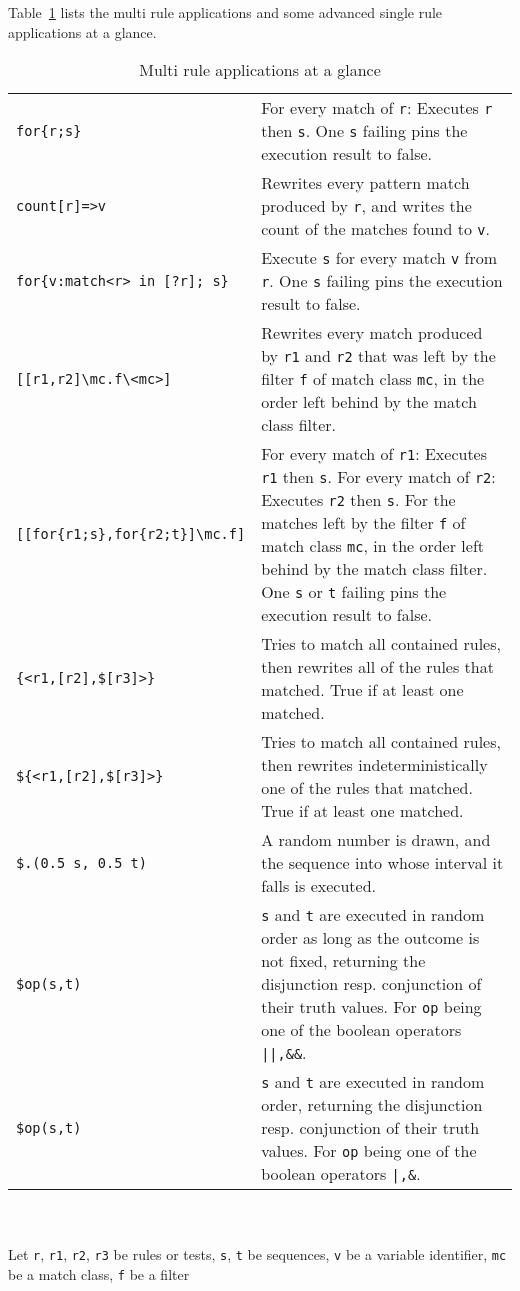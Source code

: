 Table~\ref{seqmultitab} lists the multi rule applications and some advanced single rule applications at a glance.

\begin{table}[htbp]
\begin{minipage}{\linewidth} \renewcommand{\footnoterule}{} 
\begin{tabularx}{\linewidth}{|lX|}
\hline
\texttt{for\{r;s\}} & For every match of \texttt{r}: Executes \texttt{r} then \texttt{s}. One \texttt{s} failing pins the execution result to false.\\
\texttt{count[r]=>v} & Rewrites every pattern match produced by \texttt{r}, and writes the count of the matches found to \texttt{v}.\\
\texttt{for\{v:match<r> in [?r]; s\}} & Execute \texttt{s} for every match \texttt{v} from \texttt{r}. One \texttt{s} failing pins the execution result to false.\\
\hline
\texttt{[[r1,r2]\textbackslash mc.f\textbackslash<mc>]} & Rewrites every match produced by \texttt{r1} and \texttt{r2} that was left by the filter \texttt{f} of match class \texttt{mc}, in the order left behind by the match class filter.\\
\texttt{[[for\{r1;s\},for\{r2;t\}]\textbackslash mc.f]} & For every match of \texttt{r1}: Executes \texttt{r1} then \texttt{s}. For every match of \texttt{r2}: Executes \texttt{r2} then \texttt{s}. For the matches left by the filter \texttt{f} of match class \texttt{mc}, in the order left behind by the match class filter. One \texttt{s} or \texttt{t} failing pins the execution result to false.\\
\hline
\texttt{\{<r1,[r2],\$[r3]>\}} & Tries to match all contained rules, then rewrites all of the rules that matched. True if at least one matched.\\
\texttt{\$\{<r1,[r2],\$[r3]>\}} & Tries to match all contained rules, then rewrites indeterministically one of the rules that matched. True if at least one matched.\\
\texttt{\$.(0.5 s, 0.5 t)} & A random number is drawn, and the sequence into whose interval it falls is executed.\\
\texttt{\$op(s,t)} & \texttt{s} and \texttt{t} are executed in random order as long as the outcome is not fixed, returning the disjunction resp. conjunction of their truth values. For \texttt{op} being one of the boolean operators \texttt{||,\&\&}.\\
\texttt{\$op(s,t)} & \texttt{s} and \texttt{t} are executed in random order, returning the disjunction resp. conjunction of their truth values. For \texttt{op} being one of the boolean operators \texttt{|,\&}.\\
\hline
\end{tabularx}\indexmain{\texttt{<>}}\indexmain{\texttt{<<;>>}}
\end{minipage}\\
\\ 
{\small Let \texttt{r}, \texttt{r1}, \texttt{r2}, \texttt{r3} be rules or tests, \texttt{s}, \texttt{t} be sequences, \texttt{v} be a variable identifier, \texttt{mc} be a match class, \texttt{f} be a filter }
\caption{Multi rule applications at a glance}
\label{seqmultitab}
\end{table}
